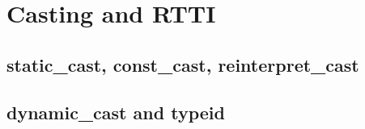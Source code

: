 \section{Casting and RTTI}\label{sec:casting}

\subsection{static\_cast, const\_cast, reinterpret\_cast}

\subsection{dynamic\_cast and typeid}
